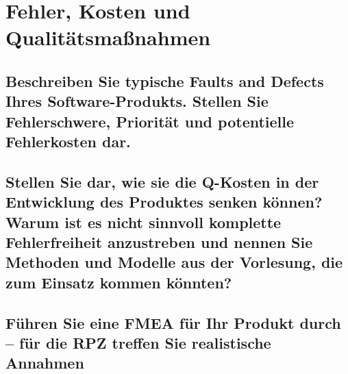 \section{Fehler, Kosten und Qualitätsmaßnahmen}





\subsection{Beschreiben Sie typische Faults and Defects Ihres Software-Produkts. Stellen Sie Fehlerschwere, Priorität und potentielle Fehlerkosten dar.}






\subsection{Stellen Sie dar, wie sie die Q-Kosten in der Entwicklung des Produktes senken können? Warum ist es nicht sinnvoll komplette Fehlerfreiheit anzustreben und nennen Sie Methoden und Modelle aus der Vorlesung, die zum Einsatz kommen könnten?}







\subsection{Führen Sie eine FMEA für Ihr Produkt durch – für die RPZ treffen Sie realistische Annahmen}





